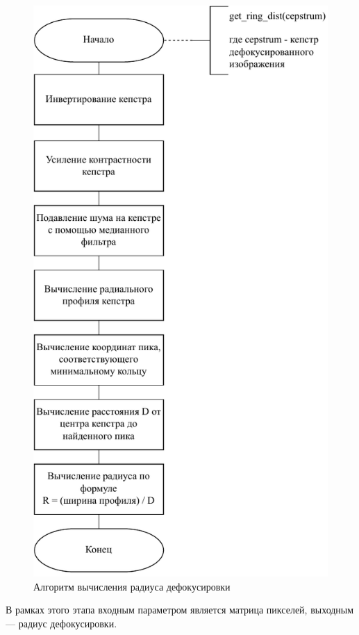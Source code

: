 \begin{figure}[H]
	\centering
	\includegraphics[scale=0.9]{assets/radius.pdf}
	\caption{Алгоритм вычисления радиуса дефокусировки}
	\label{radius}
\end{figure}

В рамках этого этапа входным параметром является матрица пикселей, выходным --- радиус дефокусировки.

